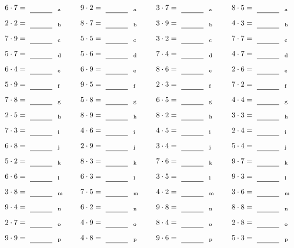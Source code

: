 \documentclass
[
  draft    = true,
  fontsize = 11pt,
  parskip  = half-
]
{scrartcl}
\begin{document}
\par\vfill\par
\begin{align*}
    \pline{6\cdot7}&=\rline{a}
  & \pline{9\cdot2}&=\rline{a}
  & \pline{3\cdot7}&=\rline{a}
  & \pline{8\cdot5}&=\rline{a} \\[1ex]
    \pline{2\cdot2}&=\rline{b}
  & \pline{8\cdot7}&=\rline{b}
  & \pline{3\cdot9}&=\rline{b}
  & \pline{4\cdot3}&=\rline{b} \\[1ex]
    \pline{7\cdot9}&=\rline{c}
  & \pline{5\cdot5}&=\rline{c}
  & \pline{3\cdot2}&=\rline{c}
  & \pline{7\cdot7}&=\rline{c} \\[1ex]
    \pline{5\cdot7}&=\rline{d}
  & \pline{5\cdot6}&=\rline{d}
  & \pline{7\cdot4}&=\rline{d}
  & \pline{4\cdot7}&=\rline{d} \\[1ex]
    \pline{6\cdot4}&=\rline{e}
  & \pline{6\cdot9}&=\rline{e}
  & \pline{8\cdot6}&=\rline{e}
  & \pline{2\cdot6}&=\rline{e} \\[1ex]
    \pline{5\cdot9}&=\rline{f}
  & \pline{9\cdot5}&=\rline{f}
  & \pline{2\cdot3}&=\rline{f}
  & \pline{7\cdot2}&=\rline{f} \\[1ex]
    \pline{7\cdot8}&=\rline{g}
  & \pline{5\cdot8}&=\rline{g}
  & \pline{6\cdot5}&=\rline{g}
  & \pline{4\cdot4}&=\rline{g} \\[1ex]
    \pline{2\cdot5}&=\rline{h}
  & \pline{8\cdot9}&=\rline{h}
  & \pline{8\cdot2}&=\rline{h}
  & \pline{3\cdot3}&=\rline{h} \\[1ex]
    \pline{7\cdot3}&=\rline{i}
  & \pline{4\cdot6}&=\rline{i}
  & \pline{4\cdot5}&=\rline{i}
  & \pline{2\cdot4}&=\rline{i} \\[1ex]
    \pline{6\cdot8}&=\rline{j}
  & \pline{2\cdot9}&=\rline{j}
  & \pline{3\cdot4}&=\rline{j}
  & \pline{5\cdot4}&=\rline{j} \\[1ex]
    \pline{5\cdot2}&=\rline{k}
  & \pline{8\cdot3}&=\rline{k}
  & \pline{7\cdot6}&=\rline{k}
  & \pline{9\cdot7}&=\rline{k} \\[1ex]
    \pline{6\cdot6}&=\rline{l}
  & \pline{6\cdot3}&=\rline{l}
  & \pline{3\cdot5}&=\rline{l}
  & \pline{9\cdot3}&=\rline{l} \\[1ex]
    \pline{3\cdot8}&=\rline{m}
  & \pline{7\cdot5}&=\rline{m}
  & \pline{4\cdot2}&=\rline{m}
  & \pline{3\cdot6}&=\rline{m} \\[1ex]
    \pline{9\cdot4}&=\rline{n}
  & \pline{6\cdot2}&=\rline{n}
  & \pline{9\cdot8}&=\rline{n}
  & \pline{8\cdot8}&=\rline{n} \\[1ex]
    \pline{2\cdot7}&=\rline{o}
  & \pline{4\cdot9}&=\rline{o}
  & \pline{8\cdot4}&=\rline{o}
  & \pline{2\cdot8}&=\rline{o} \\[1ex]
    \pline{9\cdot9}&=\rline{p}
  & \pline{4\cdot8}&=\rline{p}
  & \pline{9\cdot6}&=\rline{p}
  & \pline{5\cdot3}&=\rline{p}
\end{align*}
\end{document}
